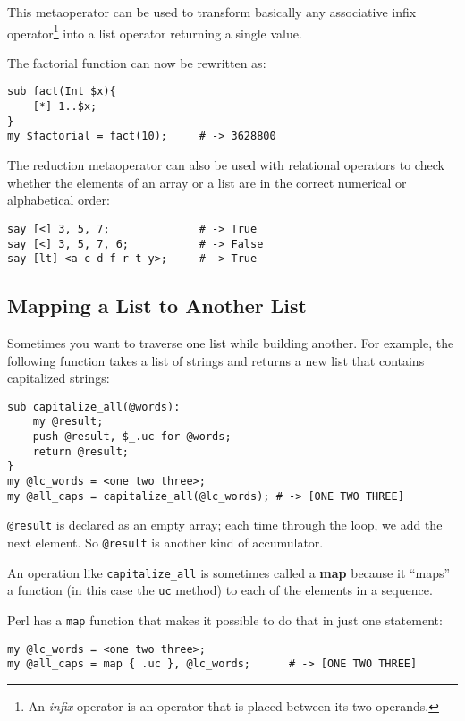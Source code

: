 This metaoperator can be used to transform basically any 
associative infix operator\footnote{An \emph{infix} operator 
is an operator that is placed between its two operands.} 
into a list operator returning a single value.

The factorial function can now be rewritten as:

\begin{verbatim}
sub fact(Int $x){
    [*] 1..$x; 
}
my $factorial = fact(10);     # -> 3628800
\end{verbatim}

The reduction metaoperator can also be used with relational 
operators to check whether the elements of an array or a list 
are in the correct numerical or alphabetical order:

\begin{verbatim}
say [<] 3, 5, 7;              # -> True
say [<] 3, 5, 7, 6;           # -> False
say [lt] <a c d f r t y>;     # -> True
\end{verbatim}

\subsection{Mapping a List to Another List}

Sometimes you want to traverse one list while building
another.  For example, the following function takes a list 
of strings and returns a new list that contains capitalized 
strings:

\begin{verbatim}
sub capitalize_all(@words):
    my @result;
    push @result, $_.uc for @words;
    return @result;
}
my @lc_words = <one two three>;
my @all_caps = capitalize_all(@lc_words); # -> [ONE TWO THREE]
\end{verbatim}
%
\verb'@result' is declared as an empty array; each time through
the loop, we add the next element.  So \verb'@result' is 
another kind of accumulator.

An operation like \verb"capitalize_all" is sometimes called a 
{\bf map} because it ``maps'' a function (in this case the 
{\tt uc} method) to each of the elements in a sequence.

Perl has a {\tt map} function that makes it possible to 
do that in just one statement:

\begin{verbatim}
my @lc_words = <one two three>;
my @all_caps = map { .uc }, @lc_words;      # -> [ONE TWO THREE]
\end{verbatim}
%

